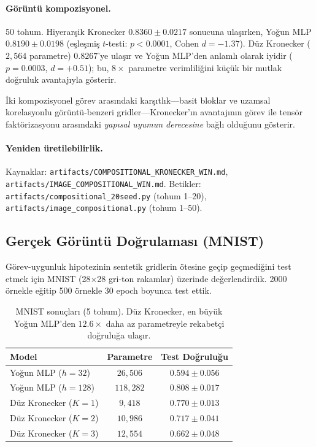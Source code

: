 \documentclass[11pt,a4paper]{article}
\begin{document}
\paragraph{Görüntü kompozisyonel.}
50 tohum. Hiyerarşik Kronecker $0.8360 \pm 0.0217$ sonucuna ulaşırken,
Yoğun MLP $0.8190 \pm 0.0198$ (eşleşmiş $t$-testi:
$p < 0.0001$, Cohen $d = -1.37$). Düz Kronecker ($2{,}564$ parametre)
$0.8267$'ye ulaşır ve Yoğun MLP'den anlamlı olarak iyidir
($p = 0.0003$, $d = +0.51$); bu, $8\times$ parametre verimliliğini
küçük bir mutlak doğruluk avantajıyla gösterir.

İki kompozisyonel görev arasındaki karşıtlık---basit bloklar ve uzamsal
korelasyonlu görüntü-benzeri gridler---Kronecker'ın avantajının görev ile
tensör faktörizasyonu arasındaki \emph{yapısal uyumun derecesine} bağlı
olduğunu gösterir.

\paragraph{Yeniden üretilebilirlik.}
Kaynaklar: \texttt{artifacts/COMPOSITIONAL\_KRONECKER\_WIN.md},
\texttt{artifacts/IMAGE\_COMPOSITIONAL\_WIN.md}.
Betikler: \texttt{artifacts/compositional\_20seed.py} (tohum 1--20),
\texttt{artifacts/image\_compositional.py} (tohum 1--50).

\subsection{Gerçek Görüntü Doğrulaması (MNIST)}
\label{sec:mnist}

Görev-uygunluk hipotezinin sentetik gridlerin ötesine geçip
geçmediğini test etmek için MNIST (28$\times$28 gri-ton rakamlar)
üzerinde değerlendirdik. 2000 örnekle eğitip 500 örnekle 30 epoch
boyunca test ettik.

\begin{table}[h]
\centering
\caption{MNIST sonuçları (5 tohum). Düz Kronecker, en büyük Yoğun
MLP'den $12.6\times$ daha az parametreyle rekabetçi doğruluğa ulaşır.}
\label{tab:mnist}
\small
\begin{tabular}{lcc}
\toprule
Model & Parametre & Test Doğruluğu \\
\midrule
Yoğun MLP ($h=32$)         & $26{,}506$  & $0.594 \pm 0.056$ \\
Yoğun MLP ($h=128$)        & $118{,}282$ & $0.808 \pm 0.017$ \\
Düz Kronecker ($K=1$)      & $9{,}418$   & $0.770 \pm 0.013$ \\
Düz Kronecker ($K=2$)      & $10{,}986$  & $0.717 \pm 0.041$ \\
Düz Kronecker ($K=3$)      & $12{,}554$  & $0.662 \pm 0.048$ \\
\bottomrule
\end{tabular}
\end{table}
\end{document}
